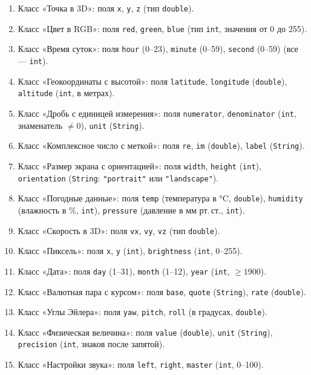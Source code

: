 \documentclass[12pt]{article}
\begin{document}
\begin{enumerate}
    \item Класс «Точка в 3D»: поля \texttt{x}, \texttt{y}, \texttt{z} (тип \texttt{double}).
    \item Класс «Цвет в RGB»: поля \texttt{red}, \texttt{green}, \texttt{blue} (тип \texttt{int}, значения от 0 до 255).
    \item Класс «Время суток»: поля \texttt{hour} (0–23), \texttt{minute} (0–59), \texttt{second} (0–59) (все — \texttt{int}).
    \item Класс «Геокоординаты с высотой»: поля \texttt{latitude}, \texttt{longitude} (\texttt{double}), \texttt{altitude} (\texttt{int}, в метрах).
    \item Класс «Дробь с единицей измерения»: поля \texttt{numerator}, \texttt{denominator} (\texttt{int}, знаменатель $\neq 0$), \texttt{unit} (\texttt{String}).
    \item Класс «Комплексное число с меткой»: поля \texttt{re}, \texttt{im} (\texttt{double}), \texttt{label} (\texttt{String}).
    \item Класс «Размер экрана с ориентацией»: поля \texttt{width}, \texttt{height} (\texttt{int}), \texttt{orientation} (\texttt{String}: \texttt{"portrait"} или \texttt{"landscape"}).
    \item Класс «Погодные данные»: поля \texttt{temp} (температура в °C, \texttt{double}), \texttt{humidity} (влажность в \%, \texttt{int}), \texttt{pressure} (давление в мм рт.\,ст., \texttt{int}).
    \item Класс «Скорость в 3D»: поля \texttt{vx}, \texttt{vy}, \texttt{vz} (тип \texttt{double}).
    \item Класс «Пиксель»: поля \texttt{x}, \texttt{y} (\texttt{int}), \texttt{brightness} (\texttt{int}, 0–255).
    \item Класс «Дата»: поля \texttt{day} (1–31), \texttt{month} (1–12), \texttt{year} (\texttt{int}, $\geq 1900$).
    \item Класс «Валютная пара с курсом»: поля \texttt{base}, \texttt{quote} (\texttt{String}), \texttt{rate} (\texttt{double}).
    \item Класс «Углы Эйлера»: поля \texttt{yaw}, \texttt{pitch}, \texttt{roll} (в градусах, \texttt{double}).
    \item Класс «Физическая величина»: поля \texttt{value} (\texttt{double}), \texttt{unit} (\texttt{String}), \texttt{precision} (\texttt{int}, знаков после запятой).
    \item Класс «Настройки звука»: поля \texttt{left}, \texttt{right}, \texttt{master} (\texttt{int}, 0–100).

\end{enumerate}
\end{document}
